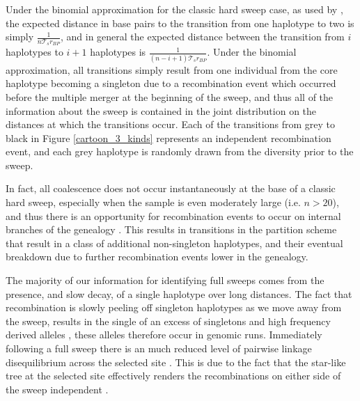 \documentclass[a4paper,10pt]{article}
\begin{document}
Under the binomial approximation for the classic hard sweep case, as used by \cite{Fay:2000usa,others}, the expected distance in base pairs to the transition from one haplotype to two is simply $\frac{1}{n\mathcal{T}_s r_{BP}}$, and in general the expected distance between the transition from $i$ haplotypes to $i+1$ haplotypes is $\frac{1}{\left(n-i+1\right)\mathcal{T}_s r_{BP}}$. Under the binomial approximation, all transitions simply result from one individual from the core haplotype becoming a singleton due to a recombination event which occurred before the multiple merger at the beginning of the sweep, and thus all of the information about the sweep is contained in the joint distribution on the distances at which the transitions occur. Each of the transitions from grey to black in Figure \ref{cartoon_3_kinds} represents an independent recombination event, and each grey haplotype is randomly drawn from the diversity prior to the sweep.

In fact, all coalescence does not occur instantaneously at the base of a classic hard sweep, especially when the sample is even moderately large (i.e. $n > 20$), and thus there is an opportunity for recombination events to occur on internal branches of the genealogy \cite{Etheridge06,Barton98}. This results in transitions in the partition scheme that result in a class of additional non-singleton haplotypes, and their eventual breakdown due to further recombination events lower in the genealogy.

The majority of our information for identifying full sweeps comes from the presence, and slow decay, of a single haplotype over long distances. The fact that recombination is slowly peeling off singleton haplotypes as we move away from the sweep, results in the single of an excess of singletons and high frequency derived alleles \citep{Fay:2000usa}, these alleles therefore occur in genomic runs.  Immediately following a full sweep there is an much reduced level of pairwise linkage disequilibrium across the selected site \citep{Stephan2006,McVean:2006ke}. This is due to the fact that the star-like tree at the selected site effectively renders the recombinations on either side of the sweep independent \citep{McVean:2006ke}.
\end{document}
